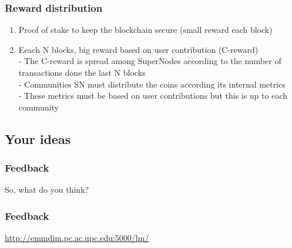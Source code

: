 \documentclass[usepdftitle=false,13pt]{beamer}
\begin{document}
\begin{frame}\frametitle{Reward distribution}
\begin{enumerate}
		\item Proof of stake to keep the blockchain secure (small reward each block)
		\item Eeach N blocks, big reward based on user contribution (C-reward)\\
		 - The C-reward is spread among SuperNodes according to the number of transactions done the last N blocks \\
		 - Communities SN must distribute the coins according its internal metrics\\
		 - These metrics must be based on user contributions but this is up to each community
\end{enumerate}
\end{frame}

\subsection{Your ideas}

\begin{frame}\frametitle{Feedback}
	\begin{center}
	  So, what do you think?
	\end{center}

\end{frame}

\begin{frame}\frametitle{Feedback}
	\begin{center}
	  \url{http://emmdim.pc.ac.upc.edu:5000/lm/}
	\end{center}

\end{frame}

\frame{\titlepage}
\end{document}
